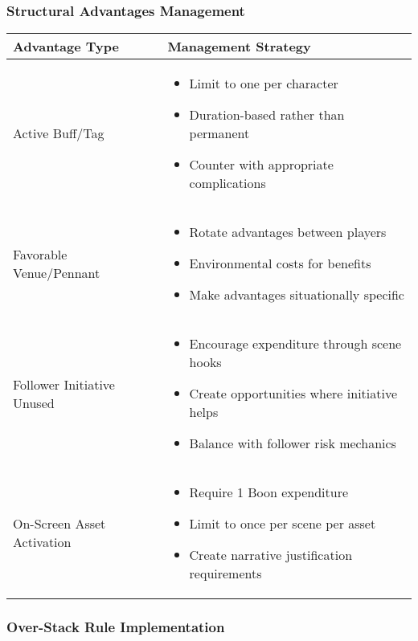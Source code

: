 \documentclass[11pt,letterpaper]{article}
\begin{document}
\subsubsection{Structural Advantages Management}

\begin{longtable}{|>{\raggedright\arraybackslash}p{4cm}|>{\raggedright\arraybackslash}p{8cm}|}
\hline
\textbf{Advantage Type} & \textbf{Management Strategy} \\
\hline
Active Buff/Tag & 
\begin{itemize}
    \item Limit to one per character
    \item Duration-based rather than permanent
    \item Counter with appropriate complications
\end{itemize} \\
\hline
Favorable Venue/Pennant & 
\begin{itemize}
    \item Rotate advantages between players
    \item Environmental costs for benefits
    \item Make advantages situationally specific
\end{itemize} \\
\hline
Follower Initiative Unused & 
\begin{itemize}
    \item Encourage expenditure through scene hooks
    \item Create opportunities where initiative helps
    \item Balance with follower risk mechanics
\end{itemize} \\
\hline
On-Screen Asset Activation & 
\begin{itemize}
    \item Require 1 Boon expenditure
    \item Limit to once per scene per asset
    \item Create narrative justification requirements
\end{itemize} \\
\hline
\end{longtable}

\subsubsection{Over-Stack Rule Implementation}
\end{document}
